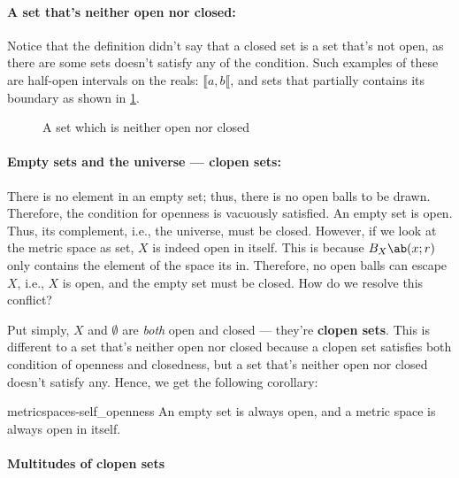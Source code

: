 \paragraph{A set that's neither open nor closed:}

Notice that the definition didn't say that a closed set is a set that's not open, as
there are some sets doesn't satisfy any of the condition. Such examples of these are
half-open intervals on the reals: \(\lBrack a, b \lBrack\), and sets that partially
contains its boundary as shown in \cref{fig:metricspaces-nether_open_nor_closed}.

\begin{figure}[]
  \centering
  
  \caption{A set which is neither open nor closed}
  \label{fig:metricspaces-nether_open_nor_closed}
\end{figure}

\paragraph{Empty sets and the universe --- clopen sets:}

There is no element in an empty set; thus, there is no open balls to be drawn.
Therefore, the condition for openness is vacuously satisfied. An empty set is open. Thus,
its complement, i.e., the universe, must be closed. However, if we look at the metric
space as set, \(X\) is indeed open in itself. This is because \(\oball{X}{x}{r}\) only
contains the element of the space its in. Therefore, no open balls can escape \(X\),
i.e., \(X\) is open, and the empty set must be closed. How do we resolve this conflict?

Put simply, \(X\) and \(\emptyset\) are \emph{both} open and closed --- they're \textbf{clopen
sets}. This is different to a set that's neither open nor closed because a clopen set satisfies both
condition of openness and closedness, but a set that's neither open nor closed
doesn't satisfy any. Hence, we get the following corollary:

\begin{cor}{}{metricspaces-self_openness}
  An empty set is always open, and a metric space is always open in itself.
\end{cor}

\paragraph{Multitudes of clopen sets}

